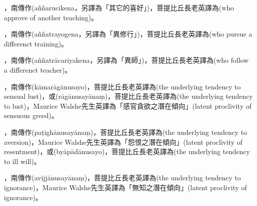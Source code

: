 \startitemgroup[noteitems]
\item{}，南傳作(aññarucikena，另譯為「其它的喜好」)，菩提比丘長老英譯為(who approve of another teaching)。
\stopitemgroup

\startitemgroup[noteitems]
\item{}，南傳作(aññatrayogena，另譯為「異修行」)，菩提比丘長老英譯為(who pursue a differenct training)。
\stopitemgroup

\startitemgroup[noteitems]
\item{}，南傳作(aññatrācariyakena，另譯為「異師」)，菩提比丘長老英譯為(who follow a differenct teacher)。
\stopitemgroup

\startitemgroup[noteitems]
\item{}，南傳作(kāmarāgānusayo)，菩提比丘長老英譯為(the underlying tendency to sensual lust)，或(rāgānusayānaṃ)，菩提比丘長老英譯為(the underlying tendency to lust)，Maurice Walshe先生英譯為「感官貪欲之潛在傾向」(latent proclivity of sensuous greed)。
\stopitemgroup

\startitemgroup[noteitems]
\item{}，南傳作(paṭighānusayānaṃ)，菩提比丘長老英譯為(the underlying tendency to aversion)，Maurice Walshe先生英譯為「怨恨之潛在傾向」(latent proclivity of resentment)，或(byāpādānusayo)，菩提比丘長老英譯為(the underlying tendency to ill will)。
\stopitemgroup

\startitemgroup[noteitems]
\item{}，南傳作(avijjānusayānaṃ)，菩提比丘長老英譯為(the underlying tendency to ignorance)，Maurice Walshe先生英譯為「無知之潛在傾向」(latent proclivity of ignorance)。
\stopitemgroup

